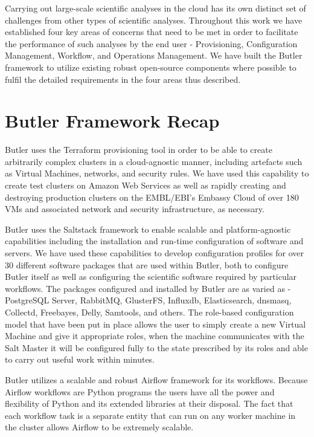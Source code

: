 Carrying out large-scale scientific analyses in the cloud has its own distinct set of challenges from other types of scientific analyses. Throughout this work we have established four key areas of concerns that need to be met in order to facilitate the performance of such analyses by the end user - Provisioning, Configuration Management, Workflow, and Operations Management. We have built the Butler framework to utilize existing robust open-source components where possible to fulfil the detailed requirements in the four areas thus described.

\section{Butler Framework Recap}
Butler uses the Terraform provisioning tool in order to be able to create arbitrarily complex clusters in a cloud-agnostic manner, including artefacts such as Virtual Machines, networks, and security rules. We have used this capability to create test clusters on Amazon Web Services as well as rapidly creating and destroying production clusters on the EMBL/EBI's Embassy Cloud of over 180 VMs and associated network and security infrastructure, as necessary. 

Butler uses the Saltstack framework to enable scalable and platform-agnostic capabilities including the installation and run-time configuration of software and servers. We have used these capabilities to develop configuration profiles for over 30 different software packages that are used within Butler, both to configure Butler itself as well as configuring the scientific software required by particular workflows. The packages configured and installed by Butler are as varied as - PostgreSQL Server, RabbitMQ, GlusterFS, Influxdb, Elasticsearch, dnsmasq, Collectd, Freebayes, Delly, Samtools, and others. The role-based configuration model that have been put in place allows the user to simply create a new Virtual Machine and give it appropriate roles, when the machine communicates with the Salt Master it will be configured fully to the state prescribed by its roles and able to carry out useful work within minutes.

Butler utilizes a scalable and robust Airflow framework for its workflows. Because Airflow workflows are Python programs the users have all the power and flexibility of Python and its extended libraries at their disposal. The fact that each workflow task is a separate entity that can run on any worker machine in the cluster allows Airflow to be extremely scalable. 


